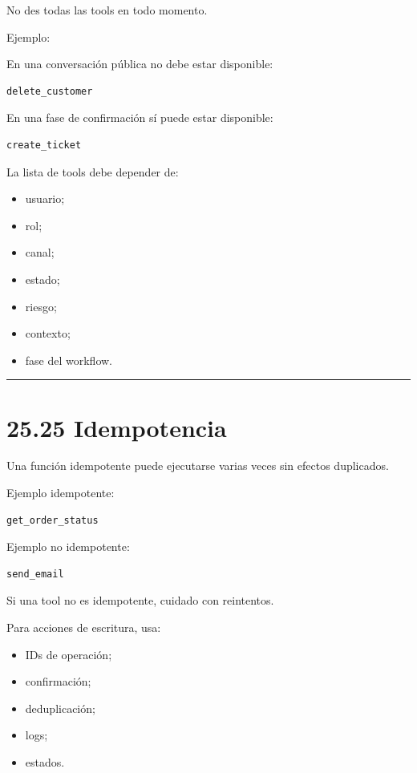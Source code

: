 No des todas las tools en todo momento.

Ejemplo:

En una conversación pública no debe estar disponible:

\begin{lstlisting}
delete_customer
\end{lstlisting}

En una fase de confirmación sí puede estar disponible:

\begin{lstlisting}
create_ticket
\end{lstlisting}

La lista de tools debe depender de:

\begin{itemize}
\tightlist
\item
  usuario;
\item
  rol;
\item
  canal;
\item
  estado;
\item
  riesgo;
\item
  contexto;
\item
  fase del workflow.
\end{itemize}

\begin{center}\rule{0.5\linewidth}{0.5pt}\end{center}

\section{25.25 Idempotencia}\label{idempotencia}

Una función idempotente puede ejecutarse varias veces sin efectos
duplicados.

Ejemplo idempotente:

\begin{lstlisting}
get_order_status
\end{lstlisting}

Ejemplo no idempotente:

\begin{lstlisting}
send_email
\end{lstlisting}

Si una tool no es idempotente, cuidado con reintentos.

Para acciones de escritura, usa:

\begin{itemize}
\tightlist
\item
  IDs de operación;
\item
  confirmación;
\item
  deduplicación;
\item
  logs;
\item
  estados.
\end{itemize}

